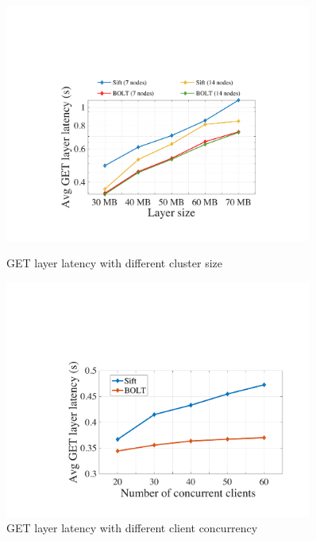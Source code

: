 \begin{figure}[t]
	\centering
	\begin{minipage}{0.3\textwidth}
		\centering
		\includegraphics[width=0.9\textwidth]{graphs/clusterscale.pdf}
		\caption{GET layer latency with different cluster size}
		\label{fig:eval-clusterscale}
	\end{minipage}%
	\hspace{1mm}
		\begin{minipage}{0.3\textwidth}
		\centering
		\includegraphics[width=0.9\textwidth]{graphs/clientscale.pdf}
		\caption{GET layer latency with different client concurrency}
		\label{fig:eval-clientscale}
	\end{minipage}%
	\hspace{1mm}
	\begin{minipage}{0.3\textwidth}
	\centering

\end{minipage}
\end{figure}
